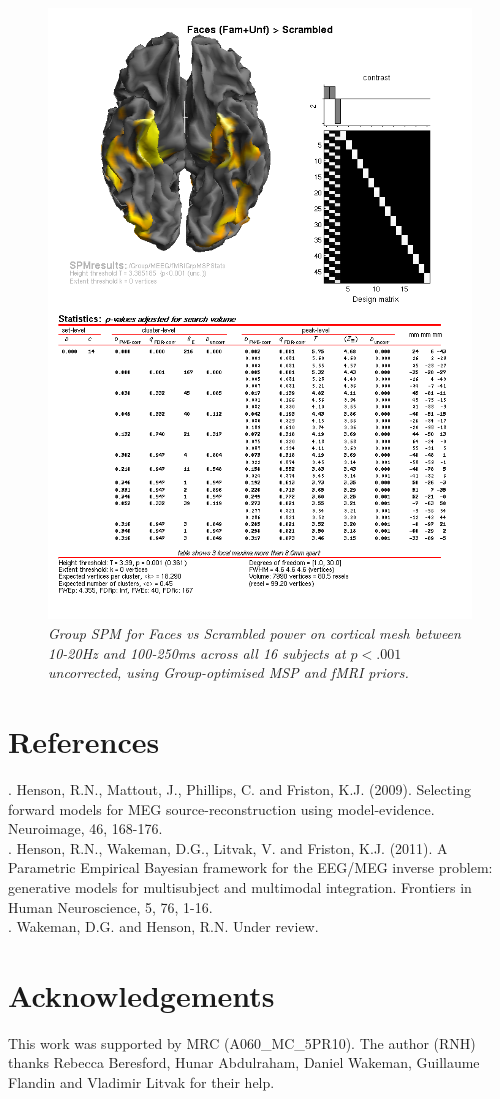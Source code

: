 \begin{figure}
\begin{center}
\includegraphics[width=150mm]{multi/figures/figure16}
\caption{\em Group SPM for Faces vs Scrambled power on cortical mesh between 10-20Hz and 100-250ms  across all 16 subjects at \(p<.001\) uncorrected, using Group-optimised MSP and fMRI priors. \label{multi:fig:16}}
\end{center}
\end{figure}

\section{References}

. Henson, R.N., Mattout, J., Phillips, C. and Friston, K.J. (2009). Selecting forward models for MEG source-reconstruction using model-evidence. Neuroimage, 46, 168-176. \\
. Henson, R.N., Wakeman, D.G., Litvak, V. and Friston, K.J. (2011). A Parametric Empirical Bayesian framework for the EEG/MEG inverse problem: generative models for multisubject and multimodal integration. Frontiers in Human Neuroscience, 5, 76, 1-16. \\
. Wakeman, D.G. and Henson, R.N. Under review. \\

\section{Acknowledgements}
This work was supported by MRC (A060\_MC\_5PR10). The author (RNH) thanks Rebecca Beresford, Hunar Abdulraham, Daniel Wakeman, Guillaume Flandin and Vladimir Litvak for their help.
